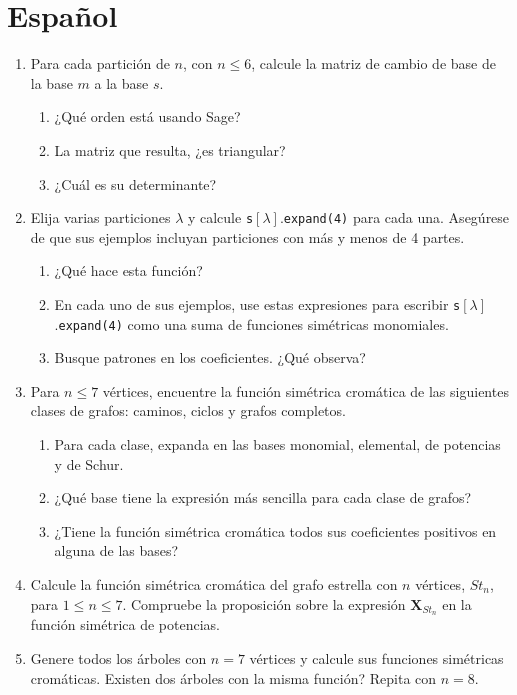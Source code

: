 \documentclass{article}
\begin{document}
\section*{Español}
\begin{enumerate}
    \item Para cada partición de $n$, con $n\leq 6$, calcule la matriz de cambio de base de la base $m$ a la base $s$.
    \begin{enumerate}
    \item ¿Qué orden está usando Sage?
    \item La matriz que resulta, ¿es triangular?
    \item ¿Cuál es su determinante?
    \end{enumerate}
    \item Elija varias particiones $\lambda$ y calcule \texttt{s}$[\lambda]$.\texttt{expand(4)} para cada una. Asegúrese de que sus ejemplos incluyan particiones con más y menos de 4 partes.
    \begin{enumerate}
        \item ¿Qué hace esta función?
        \item En cada uno de sus ejemplos, use estas expresiones para escribir \texttt{s}$[\lambda]$.\texttt{expand(4)} como una suma de funciones simétricas monomiales.
        \item Busque patrones en los coeficientes. ¿Qué observa?
    \end{enumerate}
    \item Para $n\leq 7$ vértices, encuentre la función simétrica cromática de las siguientes clases de grafos: caminos, ciclos y grafos completos.
    \begin{enumerate}
    \item Para cada clase, expanda en las bases monomial, elemental, de potencias y de Schur.
    \item ¿Qué base tiene la expresión más sencilla para cada clase de grafos?
    \item ¿Tiene la función simétrica cromática todos sus coeficientes positivos en alguna de las bases?
    \end{enumerate}

    \item Calcule la función simétrica cromática del grafo estrella con $n$ vértices, $St_n$, para $1\leq n \leq 7$. Compruebe la proposición sobre la expresión $\mathbf{X}_{St_n}$ en la función simétrica de potencias.
    \item Genere todos los árboles con $n = 7$ vértices y calcule sus funciones simétricas cromáticas. Existen dos árboles con la misma función? Repita con $n=8$.


\end{enumerate}
\end{document}
